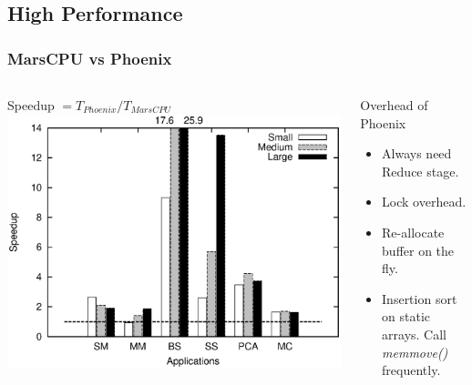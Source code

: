 \subsection{High Performance}
\begin{frame}
\frametitle{MarsCPU vs Phoenix}
\begin{columns}
\begin{block}{Speedup $= T_{Phoenix} / T_{MarsCPU}$}
\includegraphics[width=1.0\textwidth]{figure/MarsCPU_Phoenix.eps}
\end{block}
\begin{block}{Overhead of Phoenix}
\begin{itemize}
\item<2-> Always need Reduce stage.
\item<3-> Lock overhead.
\item<4-> Re-allocate buffer on the fly.
\item<5-> Insertion sort on static arrays. Call {\em memmove()} frequently.
\end{itemize}
\end{block}
\end{columns}
\end{frame}


